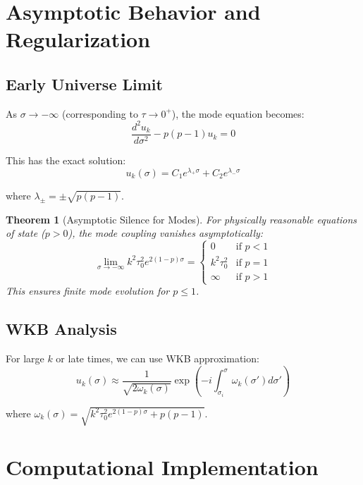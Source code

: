 \documentclass[11pt,a4paper]{article}
\newtheorem{theorem}{Theorem}[section]
\begin{document}
\section{Asymptotic Behavior and Regularization}

\subsection{Early Universe Limit}

As $\sigma \to -\infty$ (corresponding to $\tau \to 0^+$), the mode equation becomes:
\begin{equation}
\frac{d^2 u_k}{d\sigma^2} - p(p-1) u_k = 0
\end{equation}

This has the exact solution:
\begin{equation}
u_k(\sigma) = C_1 e^{\lambda_+ \sigma} + C_2 e^{\lambda_- \sigma}
\end{equation}

where $\lambda_\pm = \pm\sqrt{p(p-1)}$.

\begin{theorem}[Asymptotic Silence for Modes]
For physically reasonable equations of state ($p > 0$), the mode coupling vanishes asymptotically:
\begin{equation}
\lim_{\sigma \to -\infty} k^2 \tau_0^2 e^{2(1-p)\sigma} = \begin{cases}
0 & \text{if } p < 1 \\
k^2 \tau_0^2 & \text{if } p = 1 \\
\infty & \text{if } p > 1
\end{cases}
\end{equation}
This ensures finite mode evolution for $p \leq 1$.
\end{theorem}

\subsection{WKB Analysis}

For large $k$ or late times, we can use WKB approximation:
\begin{equation}
u_k(\sigma) \approx \frac{1}{\sqrt{2\omega_k(\sigma)}} \exp\left(-i \int_{\sigma_i}^{\sigma} \omega_k(\sigma') d\sigma'\right)
\end{equation}

where $\omega_k(\sigma) = \sqrt{k^2 \tau_0^2 e^{2(1-p)\sigma} + p(p-1)}$.

\section{Computational Implementation}
\end{document}
